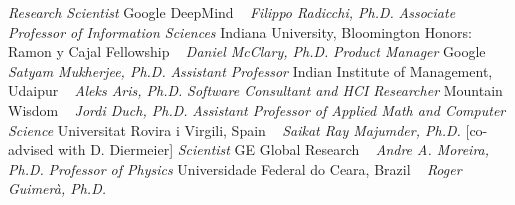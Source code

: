     \textit{Research Scientist}
    \newline
    Google DeepMind
    \newline
~
\Gap{}
\textit{Filippo Radicchi, Ph.D.}
\newline
    \textit{Associate Professor of Information Sciences}
    \newline
    Indiana University, Bloomington
    \newline
    {\footnotesize Honors: Ramon y Cajal Fellowship}
    \newline
~
\Gap{}
\textit{Daniel McClary, Ph.D.}
\newline
    \textit{Product Manager}
    \newline
    Google
    \newline
~
\Gap{}
\textit{Satyam Mukherjee, Ph.D.}
\newline
    \textit{Assistant Professor}
    \newline
    Indian Institute of Management, Udaipur
    \newline
~
\Gap{}
\textit{Aleks Aris, Ph.D.}
\newline
    \textit{Software Consultant and HCI Researcher}
    \newline
    Mountain Wisdom
    \newline
~
\Gap{}
\textit{Jordi Duch, Ph.D.}
\newline
    \textit{Assistant Professor of Applied Math and Computer Science}
    \newline
    Universitat Rovira i Virgili, Spain
    \newline
~
\Gap{}
\textit{Saikat Ray Majumder, Ph.D.}
    [co-advised with D. Diermeier]
\newline
    \textit{Scientist}
    \newline
    GE Global Research
    \newline
~
\Gap{}
\textit{Andre A. Moreira, Ph.D.}
\newline
    \textit{Professor of Physics}
    \newline
    Universidade Federal do Ceara, Brazil
    \newline
~
\Gap{}
\textit{Roger Guimer\`a, Ph.D.}
\newline
